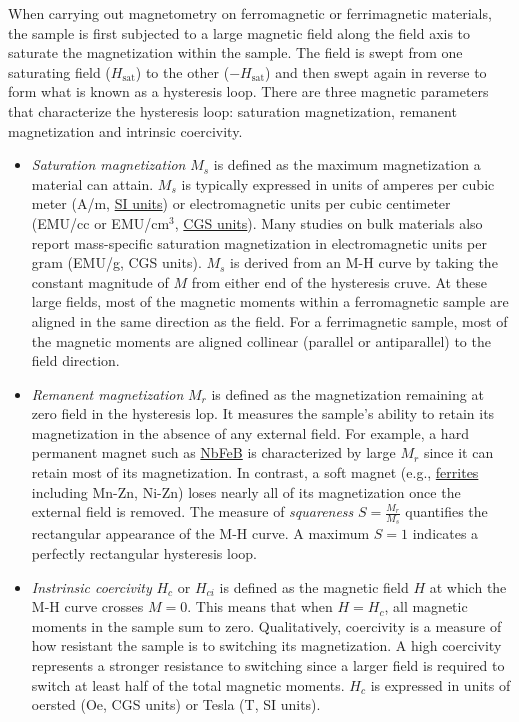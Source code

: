 \documentclass[letterpaper, 12pt]{article}
\begin{document}
When carrying out magnetometry on ferromagnetic or ferrimagnetic materials, the sample is first subjected to a large magnetic field along the field axis to saturate the magnetization within the sample. The field is swept from one saturating field ($H_\text{sat}$) to the other ($-H_\text{sat}$) and then swept again in reverse to form what is known as a hysteresis loop. There are three magnetic parameters that characterize the hysteresis loop: saturation magnetization, remanent magnetization and intrinsic coercivity.

\begin{itemize}
    \setlength\itemsep{-0.5em}
    \item \emph{Saturation magnetization} $M_s$ is defined as the maximum magnetization a material can attain. $M_s$ is typically expressed in units of amperes per cubic meter (A/m, \href{https://en.wikipedia.org/wiki/International_System_of_Units}{SI units}) or electromagnetic units per cubic centimeter (EMU/cc or EMU/cm$^3$, \href{https://en.wikipedia.org/wiki/Centimetre%E2%80%93gram%E2%80%93second_system_of_units}{CGS units}). Many studies on bulk materials also report mass-specific saturation magnetization in electromagnetic units per gram (EMU/g, CGS units). $M_s$ is derived from an M-H curve by taking the constant magnitude of $M$ from either end of the hysteresis cruve. At these large fields, most of the magnetic moments within a ferromagnetic sample are aligned in the same direction as the field. For a ferrimagnetic sample, most of the magnetic moments are aligned collinear (parallel or antiparallel) to the field direction.
    \item \emph{Remanent magnetization} $M_r$ is defined as the magnetization remaining at zero field in the hysteresis lop. It measures the sample's ability to retain its magnetization in the absence of any external field. For example, a hard permanent magnet such as \href{https://en.wikipedia.org/wiki/Neodymium_magnet}{NbFeB} is characterized by large $M_r$ since it can retain most of its magnetization. In contrast, a soft magnet (e.g., \href{https://en.wikipedia.org/wiki/Ferrite_(magnet)}{ferrites} including Mn-Zn, Ni-Zn) loses nearly all of its magnetization once the external field is removed. The measure of \emph{squareness} $S = \frac{M_r}{M_s}$ quantifies the rectangular appearance of the M-H curve. A maximum $S = 1$ indicates a perfectly rectangular hysteresis loop.
    \item \emph{Instrinsic coercivity} $H_c$ or $H_{ci}$ is defined as the magnetic field $H$ at which the M-H curve crosses $M = 0$. This means that when $H = H_c$, all magnetic moments in the sample sum to zero. Qualitatively, coercivity is a measure of how resistant the sample is to switching its magnetization. A high coercivity represents a stronger resistance to switching since a larger field is required to switch at least half of the total magnetic moments. $H_c$ is expressed in units of oersted (Oe, CGS units) or Tesla (T, SI units).  
\end{itemize}
\end{document}
